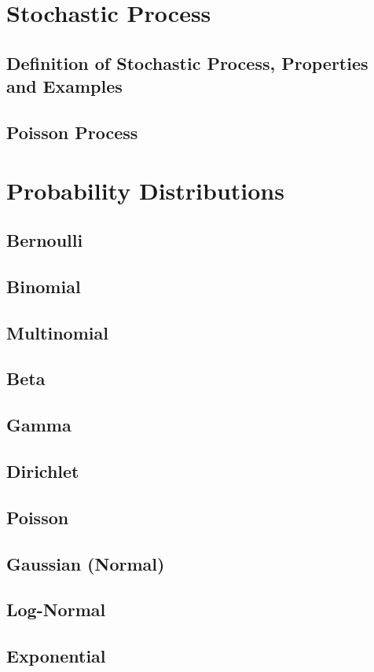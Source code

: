 \documentclass[english, 11pt]{article}
\begin{document}
\newpage

\section{Stochastic Process}
\subsection{Definition of Stochastic Process, Properties and Examples}
\subsection{Poisson Process}

\section{Probability Distributions}
\subsection{Bernoulli}
\subsection{Binomial}
\subsection{Multinomial}
\subsection{Beta}
\subsection{Gamma}
\subsection{Dirichlet}
\subsection{Poisson}
\subsection{Gaussian (Normal)}
\subsection{Log-Normal}
\subsection{Exponential}
\end{document}
